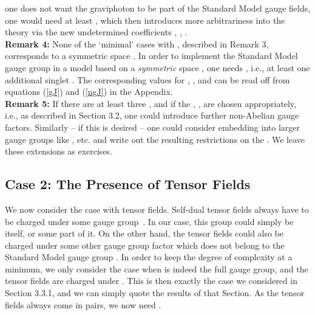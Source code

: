 \documentclass[a4paper,11pt]{article}
\providecommand{\ti}{\ensuremath{\tilde{I}}}
\providecommand{\tj}{\ensuremath{\tilde{J}}}
\providecommand{\tk}{\ensuremath{\tilde{K}}}
\providecommand{\M}{\ensuremath{\mathcal{M}}}
\begin{document}
one does not want the graviphoton to be part of the Standard Model
gauge fields, one would need at least
\coordHE{}, which then introduces more arbitrariness into the theory
via the new undetermined coefficients \coordHE{}, 
\coordHE{}, \coordHE{}.\\
\textbf{Remark 4:}
None of the `minimal' cases with \coordHE{}, described in Remark 3,
corresponds to a symmetric space \myHighlight{$\M_{VS}$}\coordHE{}. 
In order to implement  the Standard Model 
gauge group in a model based on a \emph{symmetric} space \myHighlight{$\M_{VS}$}\coordHE{},
one needs \coordHE{}, i.e., at least one additional singlet \coordHE{}.
The corresponding values for \coordHE{}, 
\coordHE{}, \coordHE{} and  \coordHE{} can be read off from
equations (\ref{gJ}) and (\ref{ngJ})  in the Appendix.\\
\textbf{Remark 5:} If there are at least three \coordHE{},
and if the \coordHE{}, \coordHE{}, \coordHE{} 
are chosen appropriately, i.e., 
as described in Section 3.2, one could introduce further non-Abelian 
gauge factors. Similarly -- if this is desired -- 
one could consider embedding \coordHE{}
into larger gauge  groups like \coordHE{}, \coordHE{} etc. 
and write out the resulting
restrictions on the \myHighlight{$C_{\ti\tj\tk}$}\coordHE{}. We leave these extensions as
exercises.




\subsection{Case 2: The Presence of Tensor Fields}

We now consider the case with tensor fields. Self-dual tensor fields
always have to be charged under some gauge group~\cite{GZ1}. 
In our case, this group 
could simply be \coordHE{} itself, or some part of it. On the other hand, 
the tensor fields
could also be charged under some other gauge group factor which does not belong
to the Standard Model gauge group \coordHE{}. In order to keep the 
degree of complexity at a minimum, we only consider the case 
when \coordHE{} is indeed the full gauge group, and  
the tensor fields are charged under \coordHE{}.
This is then exactly the case we considered in Section 3.3.1,
and we can simply quote the results of that Section.
As the tensor fields always come in pairs, we now need \coordHE{}.
\end{document}
